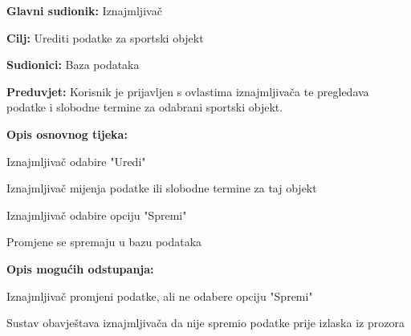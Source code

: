 					
					\noindent {}
					\begin{packed_item}
						
						\item \textbf{Glavni sudionik: } Iznajmljivač
						\item  \textbf{Cilj:}  Urediti podatke za sportski objekt
						\item  \textbf{Sudionici:} Baza podataka
						\item  \textbf{Preduvjet:} Korisnik je prijavljen s ovlastima iznajmljivača te pregledava podatke i slobodne termine za odabrani sportski objekt.
						\item  \textbf{Opis osnovnog tijeka:}
						
						\item[] \begin{packed_enum}
							
							\item Iznajmljivač odabire "Uredi"
							\item Iznajmljivač mijenja podatke ili slobodne termine za taj objekt
							\item Iznajmljivač odabire opciju "Spremi"
							\item Promjene se spremaju u bazu podataka
							
						\end{packed_enum}
						
						\item  \textbf{Opis mogućih odstupanja:}
						
						\item[] \begin{packed_item}
							
							\item[2.a] Iznajmljivač promjeni podatke, ali ne odabere opciju "Spremi"
							\item[] \begin{packed_enum}
								
								\item Sustav obavještava iznajmljivača da nije spremio podatke prije izlaska iz prozora
							
							\end{packed_enum}
							
						\end{packed_item}
						
					\end{packed_item}
				
